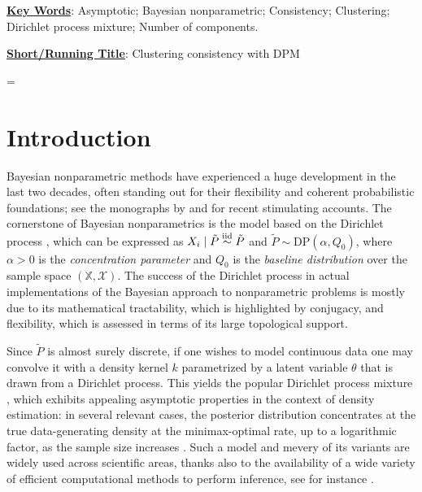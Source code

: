 \documentclass[12pt]{article}
\def\simind{\stackrel{\mbox{\scriptsize{ind}}}{\sim}}
\def\simiid{\stackrel{\mbox{\scriptsize{iid}}}{\sim}}
\begin{document}
	\vskip 24pt 
	
\noindent\underline{\bf Key Words}: 
Asymptotic; Bayesian nonparametric; Consistency; Clustering; Dirichlet process mixture; Number of components. 
	
\par\medskip\noindent
\underline{\bf Short/Running Title}: Clustering consistency with DPM
	
\vskip 10mm	
\baselineskip=\gnat	

\section{Introduction}
Bayesian nonparametric methods have experienced a huge development in the last two decades, often standing out for their flexibility and coherent probabilistic foundations; see the monographs by \cite{Muller2017} and \cite{Subhashis2017} for recent stimulating accounts. 
The cornerstone of Bayesian nonparametrics is the model based on the Dirichlet process \citep{Ferguson1973b}, which can be expressed as
$X_i \mid  \tilde{P} \simiid \tilde{P}$ and $ \tilde{P}\sim \text{DP}(\alpha, Q_0)$, 
where $\alpha > 0$ is the \emph{concentration parameter} and $Q_0$ is the \emph{baseline distribution} over the sample space $(\mathbb{X}, \mathcal{X})$. 
The success of the Dirichlet process in actual implementations of the Bayesian approach to nonparametric problems is mostly due to its mathematical tractability, which is highlighted by conjugacy, and flexibility, which is assessed in terms of its large topological support. 

Since $\tilde P$ %
is almost surely discrete, %
if one wishes to model continuous data %
one may convolve it with a %
density kernel $k$ parametrized by a latent variable $\theta$ that is drawn from a Dirichlet process. This %
yields the popular Dirichlet process mixture %
\citep{Lo1984b}, which  %
exhibits appealing %
asymptotic properties in the context of density estimation: in %
several relevant cases, the posterior distribution %
concentrates at the true data-generating density %
at the minimax-optimal rate, up to a logarithmic factor, as the sample size increases \citep{Ghosal1999,Ghosal2007}.
Such a model and mevery of its variants are widely used across scientific areas, thanks also to the availability of a wide variety of efficient computational methods to perform inference, see for instance \cite{Escobar1995a,Escobar1998,Maceachern1998,Neal2000a,Blei2006a}.
\end{document}
